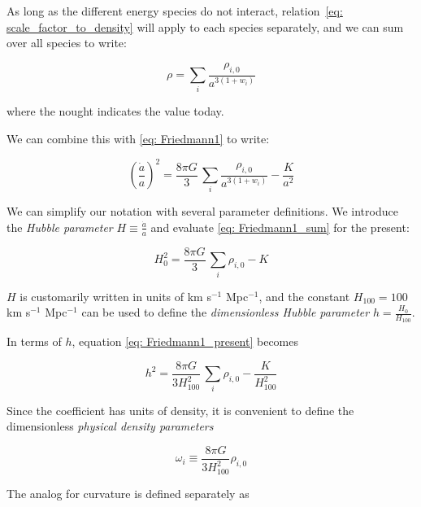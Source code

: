 As long as the different energy species do not interact,
relation~\ref{eq: scale_factor_to_density} will
apply to each species separately, and we can sum over all species to write:

\begin{equation}
\rho = \sum_i \frac{\rho_{i, 0}}{a^{3(1 + w_i)}}
\end{equation}

where the nought indicates the value today.

We can combine this with \ref{eq: Friedmann1} to write:

\begin{equation}
\label{eq: Friedmann1_sum}
\left( \frac{\dot{a}}{a} \right)^2
=
\frac{8 \pi G}{3} \, \sum_i \frac{\rho_{i, 0}}{a^{3(1 + w_i)}} - \frac{K}{a^2}
\end{equation}


We can simplify our notation with several parameter definitions.
We introduce the \textit{Hubble parameter}
$H \equiv \frac{\dot{a}}{a}$ and evaluate \ref{eq: Friedmann1_sum}
for the present:

\begin{equation}
\label{eq: Friedmann1_present}
H_0^2 = \frac{8 \pi G}{3} \, \sum_i \rho_{i, 0} - K
\end{equation}

$H$ is customarily written in units of
km s$^{-1}$ Mpc$^{-1}$, and the constant
$H_{100} = 100$ km s$^{-1}$ Mpc$^{-1}$ can be used to
define the \textit{dimensionless Hubble parameter} $h = \frac{H_0}{H_{100}}$.


In terms of $h$, equation \ref{eq: Friedmann1_present} becomes

\begin{equation}
h^2 = \frac{8 \pi G}{3 H_{100}^2} \, \sum_i \rho_{i, 0} - \frac{K}{H^2_{100}}
\end{equation}


Since the coefficient has units of density, it is convenient to define the
dimensionless \textit{physical density parameters}

\begin{equation}
\omega_i \equiv \frac{8 \pi G}{3 H_{100}^2} \rho_{i, 0}
\end{equation}

The analog for curvature is defined separately as

